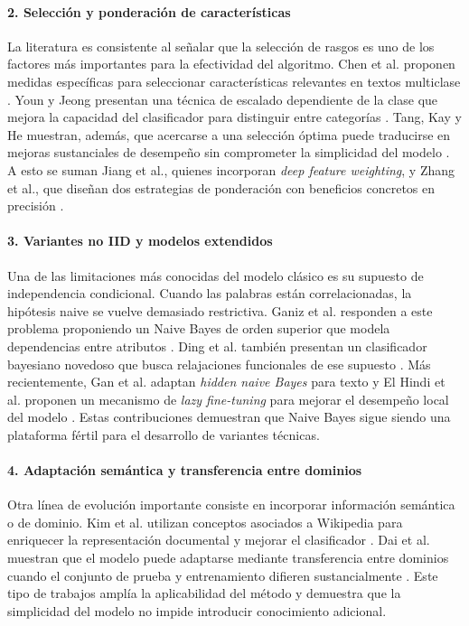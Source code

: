 \paragraph{2. Selección y ponderación de características}

La literatura es consistente al señalar que la selección de rasgos es uno de los factores más importantes para la efectividad del algoritmo. Chen et al. proponen medidas específicas para seleccionar características relevantes en textos multiclase \cite{CHEN20095432}. Youn y Jeong presentan una técnica de escalado dependiente de la clase que mejora la capacidad del clasificador para distinguir entre categorías \cite{YOUN2009477}. Tang, Kay y He muestran, además, que acercarse a una selección óptima puede traducirse en mejoras sustanciales de desempeño sin comprometer la simplicidad del modelo \cite{Tang20162508}. A esto se suman Jiang et al., quienes incorporan \textit{deep feature weighting}, y Zhang et al., que diseñan dos estrategias de ponderación con beneficios concretos en precisión \cite{Jiang2016,ZHANG2016137}.

\paragraph{3. Variantes no IID y modelos extendidos}

Una de las limitaciones más conocidas del modelo clásico es su supuesto de independencia condicional. Cuando las palabras están correlacionadas, la hipótesis naive se vuelve demasiado restrictiva. Ganiz et al. responden a este problema proponiendo un Naive Bayes de orden superior que modela dependencias entre atributos \cite{Ganiz20111022}. Ding et al. también presentan un clasificador bayesiano novedoso que busca relajaciones funcionales de ese supuesto \cite{4554061}. Más recientemente, Gan et al. adaptan \textit{hidden naive Bayes} para texto y El Hindi et al. proponen un mecanismo de \textit{lazy fine-tuning} para mejorar el desempeño local del modelo \cite{Gan2021,ELHINDI2020106652}. Estas contribuciones demuestran que Naive Bayes sigue siendo una plataforma fértil para el desarrollo de variantes técnicas.

\paragraph{4. Adaptación semántica y transferencia entre dominios}

Otra línea de evolución importante consiste en incorporar información semántica o de dominio. Kim et al. utilizan conceptos asociados a Wikipedia para enriquecer la representación documental y mejorar el clasificador \cite{KIM2018128}. Dai et al. muestran que el modelo puede adaptarse mediante transferencia entre dominios cuando el conjunto de prueba y entrenamiento difieren sustancialmente \cite{10.5555/1619645.1619732}. Este tipo de trabajos amplía la aplicabilidad del método y demuestra que la simplicidad del modelo no impide introducir conocimiento adicional.

